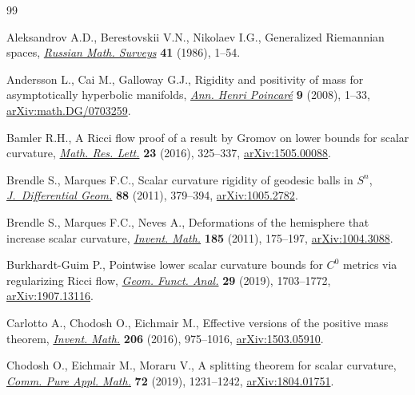 \begin{thebibliography}{99}
\footnotesize\itemsep=0pt

Aleksandrov A.D., Berestovskii V.N., Nikolaev I.G., Generalized {R}iemannian
 spaces, \href{https://doi.org/10.1070/RM1986v041n03ABEH003311}{\textit{Russian Math. Surveys}} \textbf{41} (1986), 1--54.

Andersson L., Cai M., Galloway G.J., Rigidity and positivity of mass for
 asymptotically hyperbolic manifolds, \href{https://doi.org/10.1007/s00023-007-0348-2}{\textit{Ann. Henri Poincar\'e}}
 \textbf{9} (2008), 1--33, \href{https://arxiv.org/abs/math.DG/0703259}{arXiv:math.DG/0703259}.

Bamler R.H., A {R}icci flow proof of a result by {G}romov on lower bounds for
 scalar curvature, \href{https://doi.org/10.4310/MRL.2016.v23.n2.a2}{\textit{Math. Res. Lett.}} \textbf{23} (2016), 325--337,
 \href{https://arxiv.org/abs/1505.00088}{arXiv:1505.00088}.

Brendle S., Marques F.C., Scalar curvature rigidity of geodesic balls in
 {$S^n$}, \href{https://doi.org/10.4310/jdg/1321366355}{\textit{J.~Differential Geom.}} \textbf{88} (2011), 379--394,
 \href{https://arxiv.org/abs/1005.2782}{arXiv:1005.2782}.

Brendle S., Marques F.C., Neves A., Deformations of the hemisphere that
 increase scalar curvature, \href{https://doi.org/10.1007/s00222-010-0305-4}{\textit{Invent. Math.}} \textbf{185} (2011),
 175--197, \href{https://arxiv.org/abs/1004.3088}{arXiv:1004.3088}.

Burkhardt-Guim P., Pointwise lower scalar curvature bounds for {$C^0$} metrics
 via regularizing {R}icci flow, \href{https://doi.org/10.1007/s00039-019-00514-3}{\textit{Geom. Funct. Anal.}} \textbf{29}
 (2019), 1703--1772, \href{https://arxiv.org/abs/1907.13116}{arXiv:1907.13116}.

Carlotto A., Chodosh O., Eichmair M., Effective versions of the positive mass
 theorem, \href{https://doi.org/10.1007/s00222-016-0667-3}{\textit{Invent. Math.}} \textbf{206} (2016), 975--1016,
 \href{https://arxiv.org/abs/1503.05910}{arXiv:1503.05910}.

Chodosh O., Eichmair M., Moraru V., A splitting theorem for scalar curvature,
 \href{https://doi.org/10.1002/cpa.21803}{\textit{Comm. Pure Appl. Math.}} \textbf{72} (2019), 1231--1242,
 \href{https://arxiv.org/abs/1804.01751}{arXiv:1804.01751}.


\end{thebibliography}
